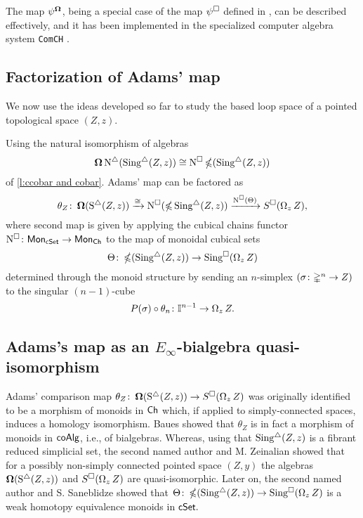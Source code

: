 
The map $\psi^{\operatorname{\mathbf{\Omega}}}$, being a special case of the map $\psi^\square$ defined in \cite{medina2020maysteenrod}, can be described effectively, and it has been implemented in the specialized computer algebra system \texttt{ComCH} \cite{medina2021computer}.

\subsection{Factorization of Adams' map} \label{factorization}

We now use the ideas developed so far to study the based loop space of a pointed topological space $(Z, z)$.

Using the natural isomorphism of algebras
\begin{equation*}
\operatorname{\mathbf{\Omega}} \operatorname{N^{\triangle}} (\operatorname{Sing^{\triangle}}(Z, z)) \cong  \operatorname{N^{\square}} \operatorname{\mathbb{\Omega}} (\operatorname{Sing^{\triangle}}(Z, z))
\end{equation*}
of \cref{l:ccobar and cobar}.
Adams' map can be factored as 
\begin{equation*}
\theta_Z \colon \operatorname{\mathbf{\Omega}}(\operatorname{S^{\triangle}}(Z, z)) \xrightarrow{\cong} 
\operatorname{N^{\square}}(\operatorname{\mathbb{\Omega}} \operatorname{Sing^{\triangle}}(Z, z)) \xrightarrow{\operatorname{N^{\square}}(\Theta)} 
S^{\square}(\operatorname{\Omega}_z Z),
\end{equation*}
where second map is given by applying the cubical chains functor $\operatorname{N^{\square}} \colon \mathsf{Mon}_{\mathsf{cSet}} \to \mathsf{Mon}_{\mathsf{Ch}}$ to the map of monoidal cubical sets
\begin{equation*}
\Theta \colon \operatorname{\mathbb{\Omega}}(\operatorname{Sing^{\triangle}}(Z, z)) \to \operatorname{Sing^{\square}}(\operatorname{\Omega}_z Z)
\end{equation*}
determined through the monoid structure by sending an $n$-simplex $(\sigma \colon \mathbb{\Delta}^n \to Z)$ to the singular $(n-1)$-cube
\begin{equation*}
P(\sigma) \circ \theta_n \colon \mathbb{I}^{n-1} \to \operatorname{\Omega}_z Z.
\end{equation*}

\subsection{Adams's map as an $E_{\infty}$-bialgebra quasi-isomorphism}

Adams' comparison map $\theta_Z \colon \operatorname{\mathbf{\Omega}}(\operatorname{S^{\triangle}}(Z, z)) \to S^{\square}(\operatorname{\Omega}_z Z)$ was originally identified to be a morphism of monoids in $\mathsf{Ch}$ which, if applied to simply-connected spaces, induces a homology isomorphism.
Baues showed that $\theta_Z$ is in fact a morphism of monoids in $\mathsf{coAlg}$, i.e., of bialgebras.
Whereas, using that $\operatorname{Sing^{\triangle}}(Z, z)$ is a fibrant reduced simplicial set, the second named author and M. Zeinalian \cite{rivera2018cubical} showed that for a possibly non-simply connected pointed space $(Z,y)$ the algebras $\operatorname{\mathbf{\Omega}}(\operatorname{S^{\triangle}}(Z, z))$ and $S^{\square}(\operatorname{\Omega}_zZ)$ are quasi-isomorphic. Later on, the second named author and S. Saneblidze 
\cite{rivera2019path} showed that $\Theta \colon \operatorname{\mathbb{\Omega}}(\operatorname{Sing^{\triangle}}(Z, z)) \to \operatorname{Sing^{\square}}(\operatorname{\Omega}_z Z)$ is a weak homotopy equivalence monoids in $\mathsf{cSet}.$

